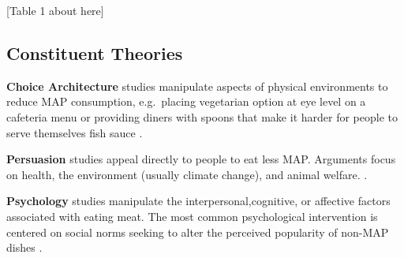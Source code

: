 \documentclass[sn-nature,referee,pdflatex]{sn-jnl}
\begin{document}
\begin{center}
[Table 1 about here]
\end{center}

\subsection{Constituent Theories}\label{constituent-theories}

\textbf{Choice Architecture} studies
\citep{andersson2021, kanchanachitra2020} manipulate aspects of physical
environments to reduce MAP consumption, e.g.~placing vegetarian option
at eye level on a cafeteria menu \citep{andersson2021} or providing
diners with spoons that make it harder for people to serve themselves
fish sauce \citep{kanchanachitra2020}.

\textbf{Persuasion} studies
\citep{kanchanachitra2020, abrahamse2007, acharya2004, banerjee2019, bianchi2022, bochmann2017, bschaden2020, carfora2023, hennessy2016, piester2020, cooney2014, cooney2016, feltz2022, haile2021, hatami2018, jalil2023, mathur2021effectiveness, merrill2009, norris2014, peacock2017, polanco2022, sparkman2021, weingarten2022}
appeal directly to people to eat less MAP. Arguments focus on health,
the environment (usually climate change), and animal welfare.
\citep{jalil2023}.

\begin{comment}
Some are designed to be emotionally activating, e.g. presenting upsetting footage of factory farms [@polanco2022], while others present information more factually, for instance about the relationship between diet and cancer [@hatami2018].
Many persuasion studies combine arguments, such as a lecture on the health and environmental consequences of eating meat
These studies formed the majority of our database.
\end{comment}

\textbf{Psychology} studies
\citep{aldoh2023, allen2002, camp2019, coker2022, piester2020, sparkman2020}
manipulate the interpersonal,cognitive, or affective factors associated
with eating meat. The most common psychological intervention is centered
on social norms seeking to alter the perceived popularity of non-MAP
dishes \citep{sparkman2020}.

\begin{comment}
Norms might be descriptive, stating how many people engaged in the desired behavior [@aldoh2023], or dynamic, telling subjects that the number of people reducing their MAP consumption is increasing over time [@aldoh2023; @coker2022; @sparkman2020].
Another study looked at response inhibition training, where subjects are trained to associate meat with an inhibiting response [@camp2019].
The first psychology study meeting our inclusion criteria was published in 2017.
\end{comment}
\end{document}
